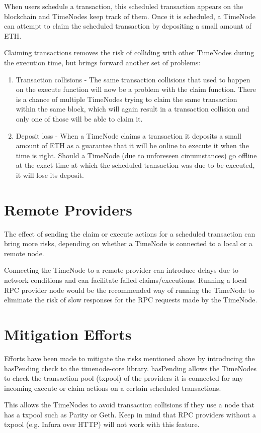 \documentclass{report}
\begin{document}
  When users schedule a transaction, this scheduled transaction appears on the blockchain and TimeNodes keep track of them. Once it is scheduled, a TimeNode can attempt to claim the scheduled transaction by depositing a small amount of ETH.
  
  Claiming transactions removes the risk of colliding with other TimeNodes during the execution time, but brings forward another set of problems:
  \begin{enumerate}
    \item Transaction collisions - The same transaction collisions that used to happen on the execute function will now be a problem with the claim function. There is a chance of multiple TimeNodes trying to claim the same transaction within the same block, which will again result in a transaction collision and only one of those will be able to claim it.
    \item Deposit loss - When a TimeNode claims a transaction it deposits a small amount of ETH as a guarantee that it will be online to execute it when the time is right. Should a TimeNode (due to unforeseen circumstances) go offline at the exact time at which the scheduled transaction was due to be executed, it will lose its deposit.
  \end{enumerate}
  \section{Remote Providers}
  The effect of sending the claim or execute actions for a scheduled transaction can bring more risks, depending on whether a TimeNode is connected to a local or a remote node.
  
  Connecting the TimeNode to a remote provider can introduce delays due to network conditions and can facilitate failed claims/executions. Running a local RPC provider node would be the recommended way of running the TimeNode to eliminate the risk of slow responses for the RPC requests made by the TimeNode.
  \section{Mitigation Efforts}
  Efforts have been made to mitigate the risks mentioned above by introducing the hasPending check to the timenode-core library. hasPending allows the TimeNodes to check the transaction pool (txpool) of the providers it is connected for any incoming execute or claim actions on a certain scheduled transactions.

  This allows the TimeNodes to avoid transaction collisions if they use a node that has a txpool such as Parity or Geth. Keep in mind that RPC providers without a txpool (e.g. Infura over HTTP) will not work with this feature.
\end{document}
